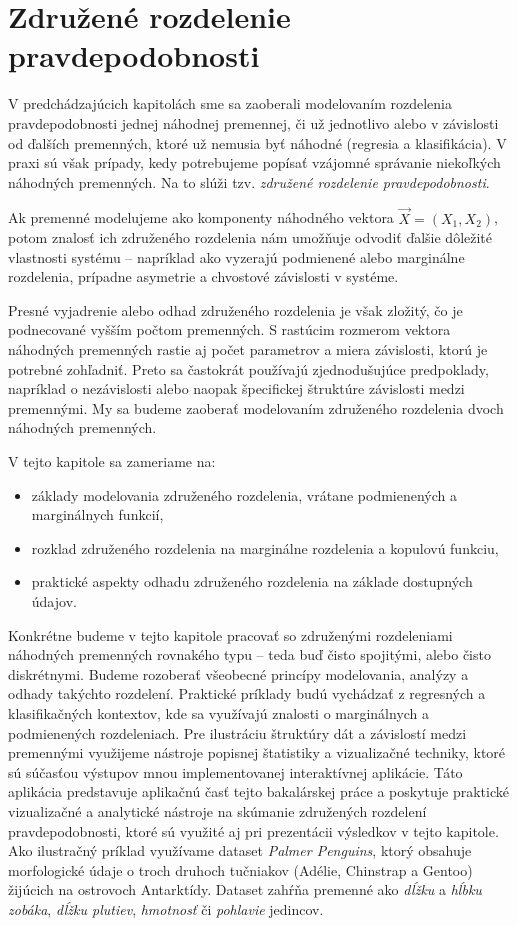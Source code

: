 \chapter{Združené rozdelenie pravdepodobnosti}\label{sec:joint_dist}

V predchádzajúcich kapitolách sme sa zaoberali modelovaním rozdelenia pravdepodobnosti jednej náhodnej premennej, či už jednotlivo alebo v závislosti od ďalších premenných, ktoré už nemusia byť náhodné (regresia a klasifikácia). V praxi sú však prípady, kedy potrebujeme popísať vzájomné správanie niekoľkých náhodných premenných. Na to slúži tzv. \textit{združené rozdelenie pravdepodobnosti}.

Ak premenné modelujeme ako komponenty náhodného vektora $\vec{X} = (X_1, X_2)$, potom znalosť ich združeného rozdelenia nám umožňuje odvodiť ďalšie dôležité vlastnosti systému – napríklad ako vyzerajú podmienené alebo marginálne rozdelenia, prípadne  asymetrie a chvostové závislosti v systéme.

Presné vyjadrenie alebo odhad združeného rozdelenia je však zložitý, čo je podnecované vyšším počtom premenných. S rastúcim rozmerom vektora náhodných premenných rastie aj počet parametrov a miera závislosti, ktorú je potrebné zohľadniť. Preto sa častokrát používajú zjednodušujúce predpoklady, napríklad o nezávislosti alebo naopak špecifickej štruktúre závislosti medzi premennými. My sa budeme zaoberať modelovaním združeného rozdelenia dvoch náhodných premenných.

V tejto kapitole sa zameriame na:
\begin{itemize}
  \item základy modelovania združeného rozdelenia, vrátane podmienených a marginálnych funkcií,
  \item rozklad združeného rozdelenia na marginálne rozdelenia a kopulovú funkciu,
  \item praktické aspekty odhadu združeného rozdelenia na základe dostupných údajov.
\end{itemize}

Konkrétne budeme v tejto kapitole pracovať so združenými rozdeleniami náhodných premenných rovnakého typu – teda buď čisto spojitými, alebo čisto diskrétnymi. Budeme rozoberať všeobecné princípy modelovania, analýzy a odhady takýchto rozdelení. Praktické príklady budú vychádzať z regresných a klasifikačných kontextov, kde sa využívajú znalosti o marginálnych a podmienených rozdeleniach. Pre ilustráciu štruktúry dát a závislostí medzi premennými využijeme nástroje popisnej štatistiky a vizualizačné techniky, ktoré sú súčasťou výstupov mnou implementovanej interaktívnej aplikácie. Táto aplikácia predstavuje aplikačnú časť tejto bakalárskej práce a poskytuje praktické vizualizačné a analytické nástroje na skúmanie združených rozdelení pravdepodobnosti, ktoré sú využité aj pri prezentácii výsledkov v tejto kapitole. Ako ilustračný príklad využívame dataset \textit{Palmer Penguins}, ktorý obsahuje morfologické údaje o troch druhoch tučniakov (Adélie, Chinstrap a Gentoo) žijúcich na ostrovoch Antarktídy. Dataset zahŕňa premenné ako \textit{dĺžku} a \textit{hĺbku zobáka}, \textit{dĺžku plutiev}, \textit{hmotnosť} či \textit{pohlavie} jedincov.

